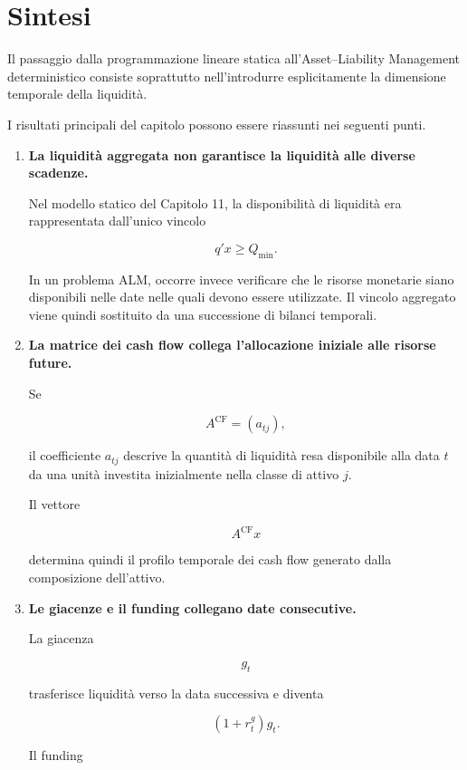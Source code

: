 \section{Sintesi}

\label{sec:cap12-sintesi}

Il passaggio dalla programmazione lineare statica all'Asset--Liability
Management deterministico consiste soprattutto nell'introdurre
esplicitamente la dimensione temporale della liquidit\`a.

I risultati principali del capitolo possono essere riassunti nei seguenti
punti.

\begin{enumerate}

\item \textbf{La liquidit\`a aggregata non garantisce la liquidit\`a alle
diverse scadenze.}

Nel modello statico del Capitolo 11, la disponibilit\`a di liquidit\`a era
rappresentata dall'unico vincolo

\[
q'x\geq Q_{\min}.
\]

In un problema ALM, occorre invece verificare che le risorse monetarie siano
disponibili nelle date nelle quali devono essere utilizzate. Il vincolo
aggregato viene quindi sostituito da una successione di bilanci temporali.

\item \textbf{La matrice dei cash flow collega l'allocazione iniziale alle
risorse future.}

Se

\[
A^{\mathrm{CF}}
=
(a_{tj}),
\]

il coefficiente $a_{tj}$ descrive la quantit\`a di liquidit\`a resa disponibile
alla data $t$ da una unit\`a investita inizialmente nella classe di attivo $j$.

Il vettore

\[
A^{\mathrm{CF}}x
\]

determina quindi il profilo temporale dei cash flow generato dalla
composizione dell'attivo.

\item \textbf{Le giacenze e il funding collegano date consecutive.}

La giacenza

\[
g_t
\]

trasferisce liquidit\`a verso la data successiva e diventa

\[
(1+r^g_t)g_t.
\]

Il funding


\end{enumerate}
